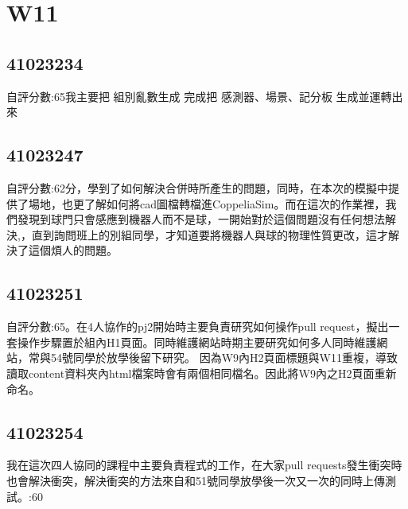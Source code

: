 \chapter{W11}


\section{41023234}
自評分數:65 我主要把  組別亂數生成  完成把  感測器、場景、記分板  生成並運轉出來


\section{41023247}
自評分數:62分，學到了如何解決合併時所產生的問題，同時，在本次的模擬中提供了場地，也更了解如何將cad圖檔轉檔進CoppeliaSim。而在這次的作業裡，我們發現到球門只會感應到機器人而不是球，一開始對於這個問題沒有任何想法解決,，直到詢問班上的別組同學，才知道要將機器人與球的物理性質更改，這才解決了這個煩人的問題。

\section{41023251}
自評分數:65。在4人協作的pj2開始時主要負責研究如何操作pull request，擬出一套操作步驟置於組內H1頁面。同時維護網站時期主要研究如何多人同時維護網站，常與54號同學於放學後留下研究。
因為W9內H2頁面標題與W11重複，導致讀取content資料夾內html檔案時會有兩個相同檔名。因此將W9內之H2頁面重新命名。

\section{41023254}
我在這次四人協同的課程中主要負責程式的工作，在大家pull requests發生衝突時也會解決衝突，解決衝突的方法來自和51號同學放學後一次又一次的同時上傳測試。:60
